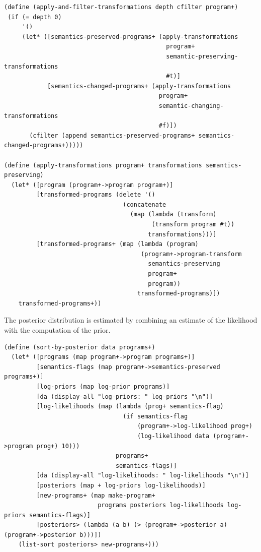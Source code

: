 \documentclass[a4paper,10pt]{article}
\begin{document}
\begin{lstlisting}[frame=trBL]
(define (apply-and-filter-transformations depth cfilter program+)
 (if (= depth 0)
     '()
     (let* ([semantics-preserved-programs+ (apply-transformations 
                                             program+ 
                                             semantic-preserving-transformations 
                                             #t)]
            [semantics-changed-programs+ (apply-transformations 
                                           program+ 
                                           semantic-changing-transformations 
                                           #f)])
       (cfilter (append semantics-preserved-programs+ semantics-changed-programs+)))))

(define (apply-transformations program+ transformations semantics-preserving)
  (let* ([program (program+->program program+)]
         [transformed-programs (delete '() 
                                 (concatenate 
                                   (map (lambda (transform) 
                                         (transform program #t)) 
                                        transformations)))]
         [transformed-programs+ (map (lambda (program) 
                                      (program+->program-transform 
                                        semantics-preserving 
                                        program+ 
                                        program)) 
                                     transformed-programs)])
    transformed-programs+))
\end{lstlisting}
The posterior distribution is estimated by combining an estimate of the likelihood with the computation of the prior.  
\begin{lstlisting}[frame=trBL]
(define (sort-by-posterior data programs+)
  (let* ([programs (map program+->program programs+)]
         [semantics-flags (map program+->semantics-preserved programs+)]
         [log-priors (map log-prior programs)]
         [da (display-all "log-priors: " log-priors "\n")]
         [log-likelihoods (map (lambda (prog+ semantics-flag)
                                 (if semantics-flag
                                     (program+->log-likelihood prog+)
                                     (log-likelihood data (program+->program prog+) 10))) 
                               programs+ 
                               semantics-flags)]
         [da (display-all "log-likelihoods: " log-likelihoods "\n")]
         [posteriors (map + log-priors log-likelihoods)] 
         [new-programs+ (map make-program+ 
                          programs posteriors log-likelihoods log-priors semantics-flags)]
         [posteriors> (lambda (a b) (> (program+->posterior a) (program+->posterior b)))])
    (list-sort posteriors> new-programs+)))
\end{lstlisting}
\end{document}
